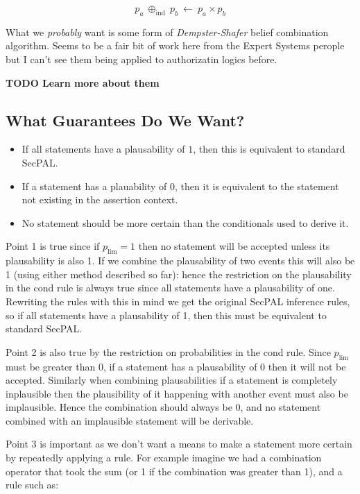 \documentclass[thesis.tex]{subfiles}
\begin{document}
\begin{equation}
  p_a~\oplus_{\text{ind}}~p_b~\gets~p_a\times p_b
\end{equation}

What we \emph{probably} want is some form of \emph{Dempster-Shafer}
belief combination algorithm.  Seems to be a fair bit of work here
from the Expert Systems perople but I can't see them being applied to
authorizatin logics before.

\textbf{TODO Learn more about them}

\subsection{What Guarantees Do We Want?} 

\begin{itemize}
\item If all statements have a plausability of $1$, then this is
  equivalent to standard SecPAL.
\item If a statement has a plauability of $0$, then it is equivalent
  to the statement not existing in the assertion context.
\item No statement should be more certain than the conditionals used
  to derive it.
\end{itemize}

Point 1 is true since if $p_{\text{lim}} = 1$ then no statement will
be accepted unless its plausability is also 1.  If we combine the
plausability of two events this will also be 1 (using either method
described so far): hence the restriction on the plausability in the
cond rule is always true since all statements have a plausability of
one.  Rewriting the rules with this in mind we get the original SecPAL
inference rules, so if all statements have a plausability of 1, then
this must be equivalent to standard SecPAL.

Point 2 is also true by the restriction on probabilities in the cond
rule.  Since $p_{\text{lim}}$ must be greater than 0, if a statement
has a plausability of 0 then it will not be accepted.  Similarly when
combining plausabilities if a statement is completely inplausible then
the plausibility of it happening with another event must also be
implausible.  Hence the combination should always be 0, and no
statement combined with an implausible statement will be derivable.

Point 3 is important as we don't want a means to make a statement more
certain by repeatedly applying a rule.  For example imagine we had a
combination operator that took the sum (or 1 if the combination was
greater than 1), and a rule such as:
\end{document}
